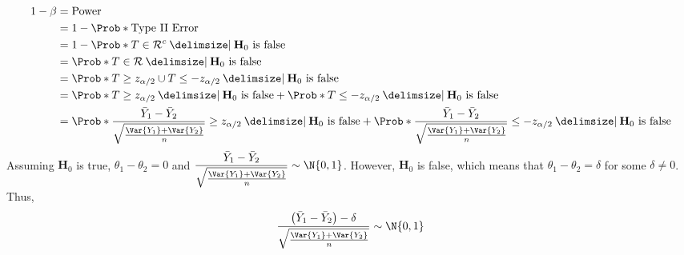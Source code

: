 \begin{align*}
      1-\beta
       & =\text{Power}                                                                                                                                                                                                                                                     \\
       & =1-\Prob*{\text{Type II Error}}                                                                                                                                                                                                                                   \\
       & =1-\Prob*{T\in\mathcal{R}^c\given \text{$ \mathbf{H}_0 $ is false}}                                                                                                                                                                                               \\
       & =\Prob*{T\in\mathcal{R}\given \text{$ \mathbf{H}_0 $ is false}}                                                                                                                                                                                                   \\
       & =\Prob*{T\ge z_{\alpha/2}\cup T\le -z_{\alpha/2}\given \text{$ \mathbf{H}_0 $ is false}}                                                                                                                                                                          \\
       & =\Prob*{T\ge z_{\alpha/2}\given \text{$ \mathbf{H}_0 $ is false}}+\Prob*{T\le -z_{\alpha/2}\given \text{$ \mathbf{H}_0 $ is false}}                                                                                                                               \\
       & =\Prob*{\frac{\bar{Y}_1-\bar{Y}_2}{\sqrt{\frac{\Var{Y_1}+\Var{Y_2}}{n}}}\ge z_{\alpha/2}\given \text{$ \mathbf{H}_0 $ is false}}+\Prob*{\frac{\bar{Y}_1-\bar{Y}_2}{\sqrt{\frac{\Var{Y_1}+\Var{Y_2}}{n}}}\le -z_{\alpha/2}\given \text{$ \mathbf{H}_0 $ is false}}
\end{align*}
Assuming $ \mathbf{H}_0 $ is true, $ \theta_1-\theta_2=0 $ and $ \displaystyle \frac{\bar{Y}_1-\bar{Y}_2}{\sqrt{\frac{\Var{Y_1}+\Var{Y_2}}{n}}} \sim \N{0,1} $.
However, $ \mathbf{H}_0 $ is false, which means that $ \theta_1-\theta_2=\delta $ for some $ \delta\ne 0 $. Thus,
\[ \frac{\bigl(\bar{Y}_1-\bar{Y}_2\bigr)-\delta}{\sqrt{\frac{\Var{Y_1}+\Var{Y_2}}{n}}}\sim \N{0,1}  \]

